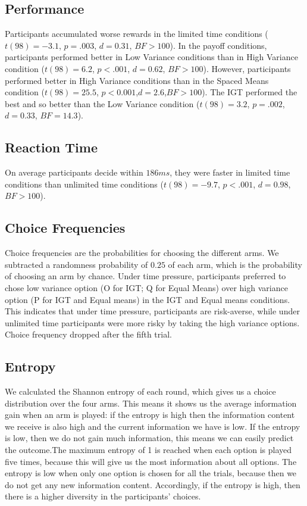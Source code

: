 \subsection{Performance}
Participants accumulated worse rewards in the limited time conditions ($t(98)=-3.1$, $p=.003$, $d=0.31$, $BF>100$).
In the payoff conditions, participants performed better in Low Variance conditions than in High Variance condition ($t(98)=6.2$, $p<.001$, $d=0.62$, $BF>100$). However, participants performed better in High Variance conditions than in the Spaced Means condition ($t(98)=25.5$, $p<0.001$,$d=2.6$,$BF>100$). The IGT performed the best and so better than the Low Variance condition ($t(98)=3.2$, $p=.002$, $d=0.33$, $BF=14.3$).

\subsection{Reaction Time}
On average participants decide within $186 ms$, they were faster in limited time conditions than unlimited time conditions ($t(98)=-9.7$, $p<.001$, $d=0.98$, $BF>100$). 

\subsection{Choice Frequencies}
Choice frequencies are the probabilities for choosing the different arms. We subtracted a randomness probability of $0.25$ of each arm, which is the probability of choosing an arm by chance. 
Under time pressure, participants preferred to chose low variance option (O for IGT; Q for Equal Means) over high variance option (P for IGT and Equal means) in the IGT and Equal means conditions. This indicates that under time pressure, participants are risk-averse, while under unlimited time participants were more risky by taking the high variance options.
Choice frequency dropped after the fifth trial. 

\subsection{Entropy}
We calculated the Shannon entropy of each round, which gives us a choice distribution over the four arms.
This means it shows us the average information gain when an arm is played: if the entropy is high then the information content we receive is also high and the current information we have is low. If the entropy is low, then we do not gain much information, this means we can easily predict the outcome.The maximum entropy  of 1 is reached when each option is played five times, because this will give us the most information about all options. The entropy is low when only one option is chosen for all the trials, because then we do not get any new information content.
Accordingly, if the entropy is high, then there is a higher diversity in the participants' choices.

